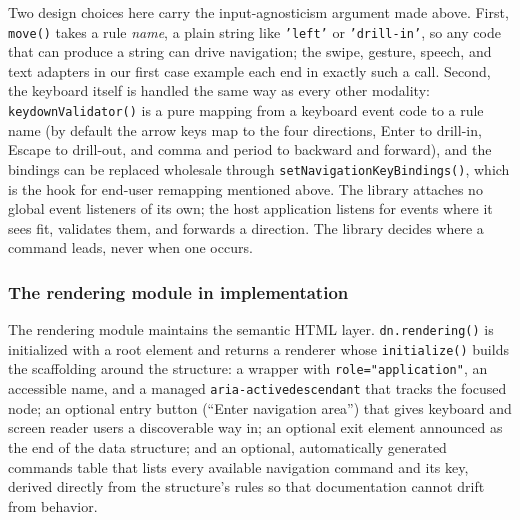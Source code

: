 \documentclass[12pt]{cmuthesis}
\begin{document}
Two design choices here carry the input-agnosticism argument made above. First, \texttt{move()} takes a rule \textit{name}, a plain string like \texttt{'left'} or \texttt{'drill-in'}, so any code that can produce a string can drive navigation; the swipe, gesture, speech, and text adapters in our first case example each end in exactly such a call. Second, the keyboard itself is handled the same way as every other modality: \texttt{keydownValidator()} is a pure mapping from a keyboard event code to a rule name (by default the arrow keys map to the four directions, Enter to drill-in, Escape to drill-out, and comma and period to backward and forward), and the bindings can be replaced wholesale through \texttt{setNavigationKeyBindings()}, which is the hook for end-user remapping mentioned above. The library attaches no global event listeners of its own; the host application listens for events where it sees fit, validates them, and forwards a direction. The library decides where a command leads, never when one occurs.

\subsubsection{The rendering module in implementation}

The rendering module maintains the semantic HTML layer. \texttt{dn.rendering()} is initialized with a root element and returns a renderer whose \texttt{initialize()} builds the scaffolding around the structure: a wrapper with \texttt{role="application"}, an accessible name, and a managed \texttt{aria-activedescendant} that tracks the focused node; an optional entry button (``Enter navigation area'') that gives keyboard and screen reader users a discoverable way in; an optional exit element announced as the end of the data structure; and an optional, automatically generated commands table that lists every available navigation command and its key, derived directly from the structure's rules so that documentation cannot drift from behavior.
\end{document}
